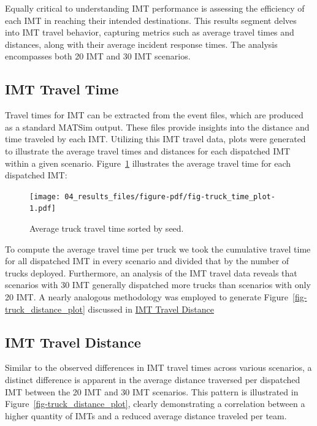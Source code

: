 \documentclass[fancy, oneside, mastersfancy, ms]{byuthesis}
\begin{document}
Equally critical to understanding IMT performance is assessing the
efficiency of each IMT in reaching their intended destinations. This
results segment delves into IMT travel behavior, capturing metrics such
as average travel times and distances, along with their average incident
response times. The analysis encompasses both 20 IMT and 30 IMT
scenarios.

\hypertarget{imt-travel-time}{%
\subsection{IMT Travel Time}\label{imt-travel-time}}

Travel times for IMT can be extracted from the event files, which are
produced as a standard MATSim output. These files provide insights into
the distance and time traveled by each IMT. Utilizing this IMT travel
data, plots were generated to illustrate the average travel times and
distances for each dispatched IMT within a given scenario.
Figure~\ref{fig-truck_time_plot} illustrates the average travel time for
each dispatched IMT:

\begin{figure}

{\centering \texttt{[image: 04\_results\_files/figure-pdf/fig-truck\_time\_plot-1.pdf]}

}

\caption{\label{fig-truck_time_plot}Average truck travel time sorted by
seed.}

\end{figure}

To compute the average travel time per truck we took the cumulative
travel time for all dispatched IMT in every scenario and divided that by
the number of trucks deployed. Furthermore, an analysis of the IMT
travel data reveals that scenarios with 30 IMT generally dispatched more
trucks than scenarios with only 20 IMT. A nearly analogous methodology
was employed to generate Figure~\ref{fig-truck_distance_plot} discussed
in \protect\hyperlink{sec-IMT_distance}{IMT Travel Distance}

\hypertarget{sec-IMT_distance}{%
\subsection{IMT Travel Distance}\label{sec-IMT_distance}}

Similar to the observed differences in IMT travel times across various
scenarios, a distinct difference is apparent in the average distance
traversed per dispatched IMT between the 20 IMT and 30 IMT scenarios.
This pattern is illustrated in Figure~\ref{fig-truck_distance_plot},
clearly demonstrating a correlation between a higher quantity of IMTs
and a reduced average distance traveled per team.
\end{document}
